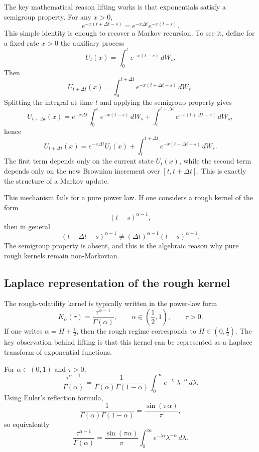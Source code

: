 The key mathematical reason lifting works is that exponentials satisfy a semigroup property. For any \(x>0\),
\[
e^{-x(t+\Delta t-s)} = e^{-x\Delta t}e^{-x(t-s)}.
\]
This simple identity is enough to recover a Markov recursion. To see it, define for a fixed rate \(x>0\) the auxiliary process
\[
U_t(x)=\int_0^t e^{-x(t-s)}\,dW_s.
\]
Then
\[
U_{t+\Delta t}(x)
=
\int_0^{t+\Delta t} e^{-x(t+\Delta t-s)}\,dW_s.
\]
Splitting the integral at time \(t\) and applying the semigroup property gives
\[
U_{t+\Delta t}(x)
=
e^{-x\Delta t}\int_0^t e^{-x(t-s)}\,dW_s
+
\int_t^{t+\Delta t} e^{-x(t+\Delta t-s)}\,dW_s,
\]
hence
\[
U_{t+\Delta t}(x)
=
e^{-x\Delta t}U_t(x)
+
\int_t^{t+\Delta t} e^{-x(t+\Delta t-s)}\,dW_s.
\]
The first term depends only on the current state \(U_t(x)\), while the second term depends only on the new Brownian increment over \([t,t+\Delta t]\). This is exactly the structure of a Markov update.

This mechanism fails for a pure power law. If one considers a rough kernel of the form
\[
(t-s)^{\alpha-1},
\]
then in general
\[
(t+\Delta t-s)^{\alpha-1}
\neq
(\Delta t)^{\alpha-1}(t-s)^{\alpha-1}.
\]
The semigroup property is absent, and this is the algebraic reason why pure rough kernels remain non-Markovian.

\subsection{Laplace representation of the rough kernel}

The rough-volatility kernel is typically written in the power-law form
\[
K_\alpha(\tau)=\frac{\tau^{\alpha-1}}{\Gamma(\alpha)},
\qquad
\alpha\in\left(\frac12,1\right),
\qquad
\tau>0.
\]
If one writes \(\alpha=H+\tfrac12\), then the rough regime corresponds to \(H\in(0,\tfrac12)\). The key observation behind lifting is that this kernel can be represented as a Laplace transform of exponential functions.

\begin{proposition}
For \(\alpha\in(0,1)\) and \(\tau>0\),
\[
\frac{\tau^{\alpha-1}}{\Gamma(\alpha)}
=
\frac{1}{\Gamma(\alpha)\Gamma(1-\alpha)}
\int_0^\infty e^{-\lambda \tau}\lambda^{-\alpha}\,d\lambda.
\]
Using Euler's reflection formula,
\[
\frac{1}{\Gamma(\alpha)\Gamma(1-\alpha)}
=
\frac{\sin(\pi\alpha)}{\pi},
\]
so equivalently
\[
\frac{\tau^{\alpha-1}}{\Gamma(\alpha)}
=
\frac{\sin(\pi\alpha)}{\pi}
\int_0^\infty e^{-\lambda \tau}\lambda^{-\alpha}\,d\lambda.
\]
\end{proposition}

